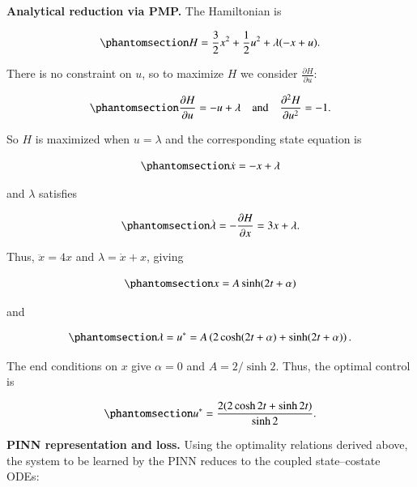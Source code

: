 \documentclass[
  number,
  preprint]{elsarticle}
\begin{document}
\textbf{Analytical reduction via PMP.} The Hamiltonian is

\begin{equation}\protect\phantomsection\label{eq-ch3-scalar-hamiltonian}{
H = \frac{3}{2} x^2 + \frac{1}{2} u^2 + \lambda (-x + u).
}\end{equation}

There is no constraint on \(u\), so to maximize \(H\) we consider
\(\frac{\partial H}{\partial u}\):

\begin{equation}\protect\phantomsection\label{eq-ch3-scalar-hu}{
\frac{\partial H}{\partial u} = -u + \lambda \quad \text{and} \quad \frac{\partial^2 H}{\partial u^2} = -1.
}\end{equation}

So \(H\) is maximized when \(u = \lambda\) and the corresponding state
equation is

\begin{equation}\protect\phantomsection\label{eq-ch3-scalar-state-ode}{
\dot{x} = -x + \lambda
}\end{equation}

and \(\lambda\) satisfies

\begin{equation}\protect\phantomsection\label{eq-ch3-scalar-costate-ode}{
\dot{\lambda} = -\frac{\partial H}{\partial x} = 3x + \lambda.
}\end{equation}

Thus, \(\ddot{x} = 4x\) and \(\lambda = \dot{x} + x\), giving

\begin{equation}\protect\phantomsection\label{eq-ch3-scalar-x-sol}{
x = A \sinh(2t + \alpha)
}\end{equation}

and

\begin{equation}\protect\phantomsection\label{eq-ch3-scalar-lambda}{
\lambda = u^* = A\left(2 \cosh(2t + \alpha) + \sinh(2t + \alpha)\right).
}\end{equation}

The end conditions on \(x\) give \(\alpha = 0\) and \(A = 2/\sinh 2\).
Thus, the optimal control is

\begin{equation}\protect\phantomsection\label{eq-ch3-scalar-u-optimal}{
u^* = \frac{2(2 \cosh 2t + \sinh 2t)}{\sinh 2}.
}\end{equation}

\textbf{PINN representation and loss.} Using the optimality relations
derived above, the system to be learned by the PINN reduces to the
coupled state--costate ODEs:
\end{document}
